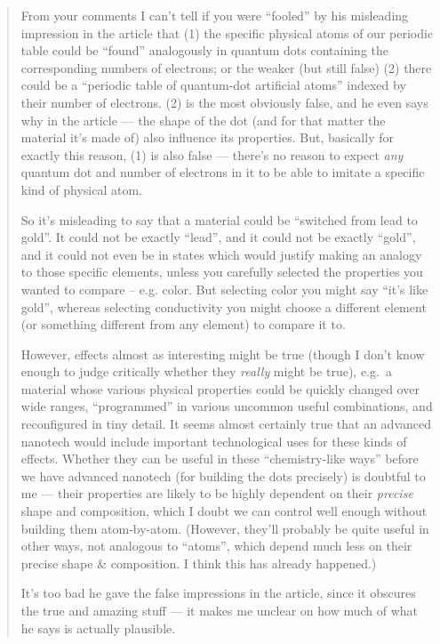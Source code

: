 \documentclass{article}
\begin{document}
\begin{quote}
From your comments I can't tell if you were ``fooled'' by his misleading
impression in the article that (1) the specific physical atoms of our
periodic table could be ``found'' analogously in quantum dots containing
the corresponding numbers of electrons; or the weaker (but still false)
(2) there could be a ``periodic table of quantum-dot artificial atoms''
indexed by their number of electrons. (2) is the most obviously false,
and he even says why in the article --- the shape of the dot (and for
that matter the material it's made of) also influence its properties.
But, basically for exactly this reason, (1) is also false --- there's no
reason to expect \emph{any} quantum dot and number of electrons in it to
be able to imitate a specific kind of physical atom.

So it's misleading to say that a material could be ``switched from lead
to gold''. It could not be exactly ``lead'', and it could not be exactly
``gold'', and it could not even be in states which would justify making
an analogy to those specific elements, unless you carefully selected the
properties you wanted to compare -- e.g. color. But selecting color you
might say ``it's like gold'', whereas selecting conductivity you might
choose a different element (or something different from any element) to
compare it to.

However, effects almost as interesting might be true (though I don't
know enough to judge critically whether they \emph{really} might be
true), e.g.~a material whose various physical properties could be
quickly changed over wide ranges, ``programmed'' in various uncommon
useful combinations, and reconfigured in tiny detail. It seems almost
certainly true that an advanced nanotech would include important
technological uses for these kinds of effects. Whether they can be
useful in these ``chemistry-like ways'' before we have advanced nanotech
(for building the dots precisely) is doubtful to me --- their properties
are likely to be highly dependent on their \emph{precise} shape and
composition, which I doubt we can control well enough without building
them atom-by-atom. (However, they'll probably be quite useful in other
ways, not analogous to ``atoms'', which depend much less on their
precise shape \& composition. I think this has already happened.)

It's too bad he gave the false impressions in the article, since it
obscures the true and amazing stuff --- it makes me unclear on how much
of what he says is actually plausible.


\end{quote}
\end{document}
